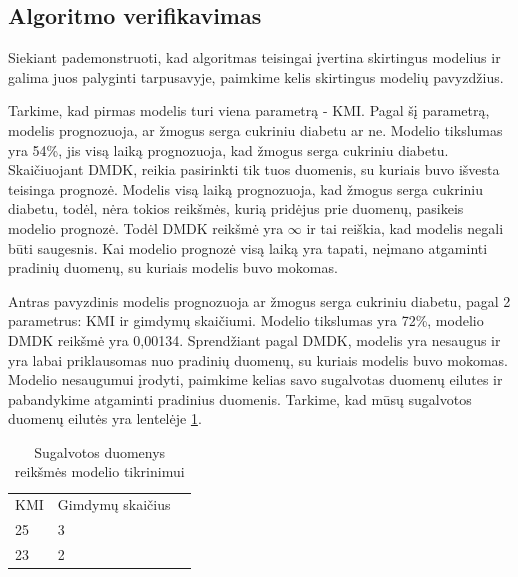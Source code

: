 \documentclass{VUMIFInfBakalaurinis}
\begin{document}
\subsection{Algoritmo verifikavimas}
\par Siekiant pademonstruoti, kad algoritmas teisingai įvertina skirtingus modelius ir galima juos palyginti tarpusavyje, paimkime kelis skirtingus modelių pavyzdžius.
\par Tarkime, kad pirmas modelis turi viena parametrą - KMI. Pagal šį parametrą, modelis prognozuoja, ar žmogus serga cukriniu diabetu ar ne. Modelio tikslumas yra 54\%, jis visą laiką prognozuoja, kad žmogus serga cukriniu diabetu. Skaičiuojant DMDK, reikia pasirinkti tik tuos duomenis, su kuriais buvo išvesta teisinga prognozė. Modelis visą laiką prognozuoja, kad žmogus serga cukriniu diabetu, todėl, nėra tokios reikšmės, kurią pridėjus prie duomenų, pasikeis modelio prognozė. Todėl DMDK reikšmė yra $\infty$ ir tai reiškia, kad modelis negali būti saugesnis. Kai modelio prognozė visą laiką yra tapati, neįmano atgaminti pradinių duomenų, su kuriais modelis buvo mokomas.
\par Antras pavyzdinis modelis prognozuoja ar žmogus serga cukriniu diabetu, pagal 2 parametrus: KMI ir gimdymų skaičiumi. Modelio tikslumas yra 72\%, modelio DMDK reikšmė yra 0,00134. Sprendžiant pagal DMDK, modelis yra nesaugus ir yra labai priklausomas nuo pradinių duomenų, su kuriais modelis buvo mokomas. Modelio nesaugumui įrodyti, paimkime kelias savo sugalvotas duomenų eilutes ir pabandykime atgaminti pradinius duomenis. Tarkime, kad mūsų sugalvotos duomenų eilutės yra lentelėje \ref{tab:KMI ir gimdymų skaičius}.

\begin{table}[h]
\centering
\begin{tabular}{|l|l|l|}
\cline{1-2}
KMI & Gimdymų skaičius \\\cline{1-2}
25      & 3 \\\cline{1-2}
23       & 2 \\\cline{1-2}
\end{tabular}
\caption{Sugalvotos duomenys reikšmės modelio tikrinimui}
\label{tab:KMI ir gimdymų skaičius}
\end{table}
\end{document}
